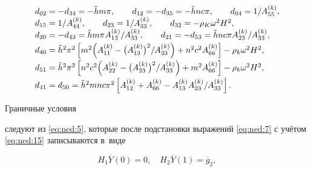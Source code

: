 $$

\begin{array}{l}

d_{02}=-d_{34}=-\tilde hm\pi,\qquad d_{12}=-d_{35}=-\tilde hnc\pi,\qquad d_{04}=1/A_{55}^{(k)},\\

d_{15}=1/{A_{44}^{(k)}},\qquad d_{23}=1/A_{33}^{(k)},\qquad d_{32}=-\rho_K\omega^2H^2,\\

d_{20}=-d_{43}=\tilde hm\pi A_{13}^{(k)}/A_{33}^{(k)},\qquad d_{21}=-d_{53}=\tilde hnc\pi A_{23}^{(k)}/A_{33}^{(k)}, \vspace{1mm}\\






d_{40}=\tilde h^2\pi ^2\left[ m^2\Bigl(A_{11}^{(k)}  - \bigl(A_{13}^{(k)}\bigr)^2/A_{33}^{(k)} \Bigr)+n^2 c^2 A_{66}^{(k)} \right]-\rho_k\omega ^2 H^2, \vspace{1mm}\\



d_{51}=\tilde h^2\pi ^2\left[ n^2 c^2\Bigl({A_{22}^{(k)} - \bigl(A_{23}^{(k)}\bigr)^2/A_{33}^{(k)}\Bigr)+m^2 A_{66}^{(k)}}\right]-\rho_k\omega ^2 H^2 , \vspace{1mm}\\



d_{41}=d_{50}=\tilde h^2mnc\pi^2\left[{A_{12}^{(k)}+A_{66}^{(k)}- A_{13}^{(k)} A_{23}^{(k)}}/A_{33}^{(k)} \right] .

\end{array}

$$



Граничные условия %

следуют из \eqref{eq:ned:5}, которые после подстановки выражений \eqref{eq:ned:7} с учётом \eqref{eq:ned:15} записываются в~виде

\begin{equation}

\label{eq:ned:16}

H_1\overline Y(0 )=0,\quad H_2\overline Y(1)=\overline g_2,

\end{equation}

